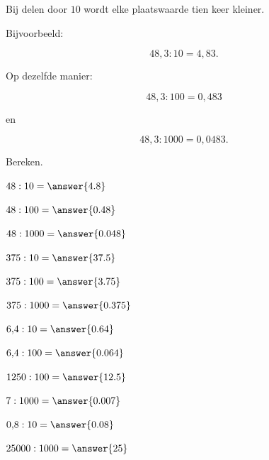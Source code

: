 \documentclass{ximera}
\begin{document}

Bij delen door \(10\) wordt elke plaatswaarde tien keer kleiner.

Bijvoorbeeld:

\[
48{,}3:10=4{,}83.
\]

Op dezelfde manier:

\[
48{,}3:100=0{,}483
\]

en

\[
48{,}3:1000=0{,}0483.
\]


\begin{oefening}{\oefB\ESS}

Bereken.

\begin{question} \(48:10=\answer{4.8}\) \end{question}

\begin{question} \(48:100=\answer{0.48}\) \end{question}

\begin{question} \(48:1000=\answer{0.048}\) \end{question}

\begin{question} \(375:10=\answer{37.5}\) \end{question}

\begin{question} \(375:100=\answer{3.75}\) \end{question}

\begin{question} \(375:1000=\answer{0.375}\) \end{question}

\begin{question} \(6{,}4:10=\answer{0.64}\) \end{question}

\begin{question} \(6{,}4:100=\answer{0.064}\) \end{question}

\begin{question} \(1250:100=\answer{12.5}\) \end{question}

\begin{question} \(7:1000=\answer{0.007}\) \end{question}

\begin{question} \(0{,}8:10=\answer{0.08}\) \end{question}

\begin{question} \(25000:1000=\answer{25}\) \end{question}

\end{oefening}
\end{document}
